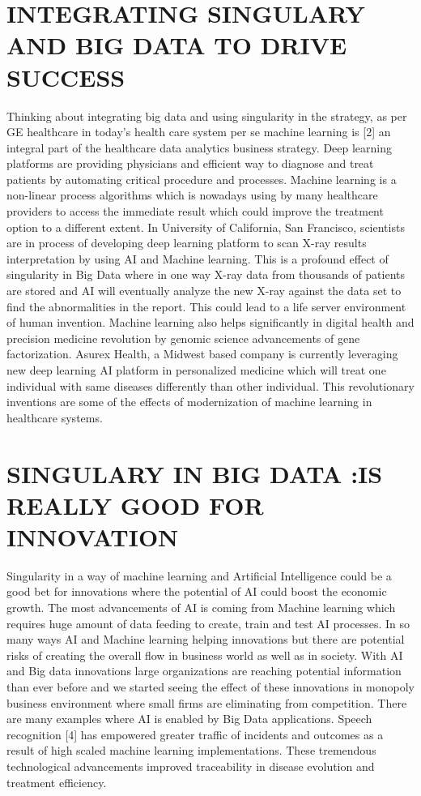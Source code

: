 \documentclass[sigconf]{acmart}
\begin{document}
\section{INTEGRATING SINGULARY AND BIG DATA TO DRIVE SUCCESS}
Thinking about integrating big data and using singularity in the strategy, as per GE healthcare in today’s health care system per se machine learning is [2] an integral part of the healthcare data analytics business strategy. Deep learning platforms are providing physicians and efficient way to diagnose and treat patients by automating critical procedure and processes. Machine learning is a non-linear process algorithms which is nowadays using by many healthcare providers to access the immediate result which could improve the treatment option to a different extent. In University of California, San Francisco, scientists are in process of developing deep learning platform to scan X-ray results interpretation by using AI and Machine learning. This is a profound effect of singularity in Big Data where in one way X-ray data from thousands of patients are stored and AI will eventually analyze the new X-ray against the data set to find the abnormalities in the report. This could lead to a life server environment of human invention. Machine learning also helps significantly in digital health and precision medicine revolution by genomic science advancements of gene factorization. Asurex Health, a Midwest based company is currently leveraging new deep learning AI platform in personalized medicine which will treat one individual with same diseases differently than other individual. This revolutionary inventions are some of the effects of modernization of machine learning in healthcare systems. 

\section{SINGULARY IN BIG DATA :IS REALLY GOOD FOR INNOVATION}
Singularity in a way of machine learning and Artificial Intelligence could be a good bet for innovations where the potential of AI could boost the economic growth. The most advancements of AI is coming from Machine learning which requires huge amount of data feeding to create, train and test AI processes. In so many ways AI and Machine learning helping innovations but there are potential risks of creating the overall flow in business world as well as in society. With AI and Big data innovations large organizations are reaching potential information than ever before and we started seeing the effect of these innovations in monopoly business environment where small firms are eliminating from competition. There are many examples where AI is enabled by Big Data applications. Speech recognition [4] has empowered greater traffic of incidents and outcomes as a result of high scaled machine learning implementations. These tremendous technological advancements improved traceability in disease evolution and treatment efficiency. 
\end{document}
